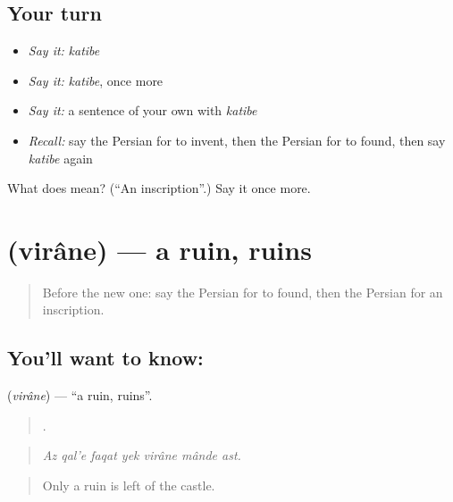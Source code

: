 \subsection*{Your turn}
\begin{itemize}
\raggedright
  \item \emph{Say it:} \emph{katibe}
  \item \emph{Say it:} \emph{katibe}, once more
  \item \emph{Say it:} a sentence of your own with \emph{katibe}
  \item \emph{Recall:} say the Persian for to invent, then the Persian for to found, then say \emph{katibe} again
\end{itemize}

\begin{tcolorbox}[breakable,colback=teal!4,colframe=teal!35!black,title={Before you move on}]
What does  mean? (\textquotedblleft{}An inscription\textquotedblright{}.) Say it once more.
\end{tcolorbox}
\section[\texorpdfstring{\fa{ویرانه} (virâne)}{ویرانه (virâne)}]{ (virâne) — a ruin, ruins}

\label{lesson:FA-C354-virane}



\begin{quote}
Before the new one: say the Persian for to found, then the Persian for an inscription.
\end{quote}

\subsection*{You'll want to know: }
\textbf{} (\emph{virâne}) — \textquotedblleft{}a ruin, ruins\textquotedblright{}.

\begin{quote}
      .
\end{quote}

\begin{quote}
\emph{Az qal'e faqat yek virâne mânde ast.}
\end{quote}

\begin{quote}
Only a ruin is left of the castle.
\end{quote}

